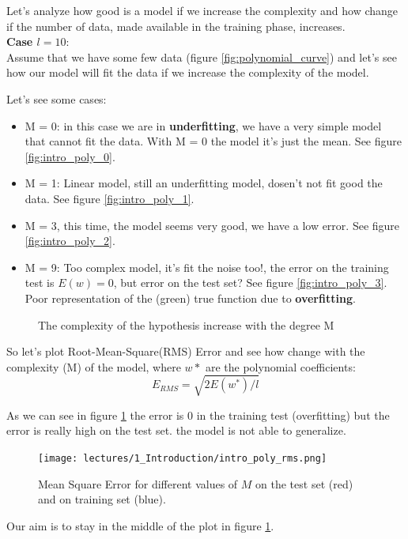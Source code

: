 \documentclass[../main.tex]{subfiles}
\begin{document}
Let's analyze how good is a model if we increase the complexity and how change if the number of data, made available in the training phase, increases.\\
\noindent \textbf{Case $l = 10$}:\\
Assume that we have some few data  (figure \ref{fig:polynomial_curve}) and let's see how our model will fit the data if we increase the complexity of the model.

Let's see some cases:
\begin{itemize}
    \item M = 0: in this case we are in \textbf{underfitting}, we have a very simple model that cannot fit the data. With M = 0 the model it's just the mean. See figure \ref{fig:intro_poly_0}.
    \item M = 1: Linear model,  still an underfitting model, dosen't not fit good the data. See figure \ref{fig:intro_poly_1}.
    \item M = 3, this time, the model seems very good, we have a low error. See figure \ref{fig:intro_poly_2}.
    \item M = 9: Too complex model, it's fit the noise too!, the error on the training test is $E(w) = 0$, but error on the test set?  See figure \ref{fig:intro_poly_3}. Poor representation of the (green) true function due to \textbf{overfitting}.
\end{itemize}

\begin{figure}[ht]
  \centering
  \caption{The complexity of the hypothesis increase with the degree M}
\end{figure}

So let's plot Root-Mean-Square(RMS) Error and see how change with the complexity (M) of the model, where $w*$ are the polynomial coefficients:
$$ E_{RMS} = \sqrt{2E(w^*)/l}$$

As we can see in figure \ref{fig:intro_poly_rms} the error is 0 in the training test (overfitting) but the error is really high on the test set. the model is not able to generalize.\\
\begin{figure}[ht]
    \centering
    \texttt{[image: lectures/1\_Introduction/intro\_poly\_rms.png]}
    \caption{Mean Square Error for different values of $M$ on the test set (red) and on training set (blue).}
    \label{fig:intro_poly_rms}
\end{figure}
Our aim is to stay in the middle of the plot in figure \ref{fig:intro_poly_rms}.
\end{document}
